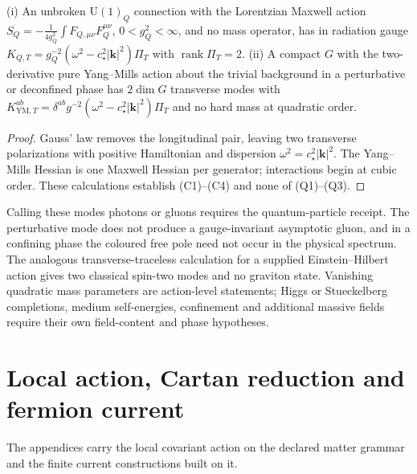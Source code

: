 \documentclass[11pt]{article}
\begin{document}
\begin{theorem}
(i) An unbroken \(\mathrm U(1)_Q\) connection with the Lorentzian Maxwell action
\(S_Q=-\frac1{4g_Q^2}\int F_{Q,\mu\nu}F_Q^{\mu\nu}\), \(0<g_Q^2<\infty\), and no mass
operator, has in radiation gauge
\(K_{Q,T}=g_Q^{-2}(\omega^2-c_\star^2|\mathbf k|^2)\Pi_T\) with
\(\operatorname{rank}\Pi_T=2\). (ii) A compact \(G\) with the two-derivative pure
Yang--Mills action about the trivial background in a perturbative or
deconfined phase has \(2\dim G\) transverse modes with
\(K^{ab}_{\mathrm{YM},T}=\delta^{ab}g^{-2}(\omega^2-c_\star^2|\mathbf k|^2)\Pi_T\)
and no hard mass at quadratic order.
\end{theorem}

\begin{proof}
Gauss' law removes the longitudinal pair, leaving two transverse polarizations
with positive Hamiltonian and dispersion \(\omega^2=c_\star^2|\mathbf k|^2\). The
Yang--Mills Hessian is one Maxwell Hessian per generator; interactions begin
at cubic order. These calculations establish (C1)--(C4) and none of
(Q1)--(Q3).
\end{proof}

Calling these modes photons or gluons requires the quantum-particle receipt.
The perturbative mode does not produce a gauge-invariant asymptotic gluon, and
in a confining phase the coloured free pole need not occur in the physical
spectrum. The analogous transverse-traceless calculation for a supplied
Einstein--Hilbert action gives two classical spin-two modes and no graviton
state. Vanishing quadratic mass parameters are action-level statements; Higgs
or Stueckelberg completions, medium self-energies, confinement and additional
massive fields require their own field-content and phase hypotheses.



\appendix
\section{Local action, Cartan reduction and fermion current}
\label{app:local-action}

The appendices carry the local covariant action on the declared matter
grammar and the finite current constructions built on it.
\end{document}
